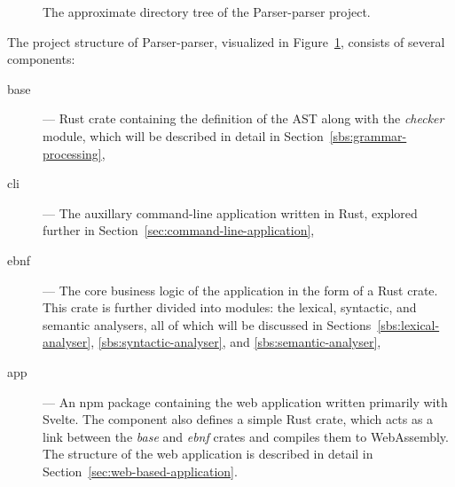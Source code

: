 \documentclass[english,bachelors,forcepolishlogotype]{wizthesis}
\newcommand{\thisproject}{Parser-parser}
\begin{document}
\begin{figure}[H]
  \centering
  \caption{The approximate directory tree of the \thisproject{} project.}
  \label{fig:file-tree}
\end{figure}

The project structure of \thisproject{}, visualized in
Figure~\ref{fig:file-tree}, consists of several components:
\begin{description}
  \item[base] --- Rust crate containing the definition of the AST along with the
  \emph{checker} module, which will be described in detail in
  Section~\ref{sbs:grammar-processing},
  \item[cli] --- The auxillary command-line application written in Rust,
  explored further in Section~\ref{sec:command-line-application},
  \item[ebnf] --- The core business logic of the application in the form of a
  Rust crate. This crate is further divided into modules: the lexical,
  syntactic, and semantic analysers, all of which will be discussed in
  Sections~\ref{sbs:lexical-analyser}, \ref{sbs:syntactic-analyser}, and
  \ref{sbs:semantic-analyser},
  \item[app] --- An npm package containing the web application written primarily
  with Svelte. The component also defines a simple Rust crate, which acts as a
  link between the \emph{base} and \emph{ebnf} crates and compiles them to
  WebAssembly. The structure of the web application is described in detail in
  Section~\ref{sec:web-based-application}.
\end{description}
\end{document}
